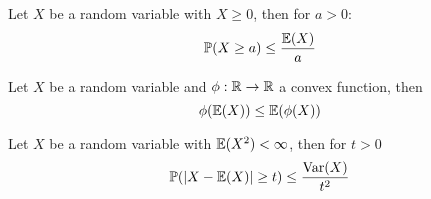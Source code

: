 \begin{theorem*}
  Let \(X\) be a random variable with \(X \geq 0\), then for \(a > 0\):
  \vspace{-7pt}
  \[\mathbb{P}(X \geq a) \leq \frac{\mathbb{E}(X)}{a}\]
\end{theorem*}

\begin{theorem*}
  Let \(X\) be a random variable and \(\phi: \mathbb{R} \to \mathbb{R}\) a convex function, then
  \vspace{-7pt}
  \[\phi(\mathbb{E}(X)) \leq \mathbb{E}(\phi(X))\]
\end{theorem*}

\begin{theorem*}
  Let \(X\) be a random variable with \(\mathbb{E}(X^2) < \infty\), then for \(t > 0\)
  \[\mathbb{P}(|X - \mathbb{E}(X)| \geq t) \leq \frac{\operatorname{Var}(X)}{t^2}\]
\end{theorem*}
